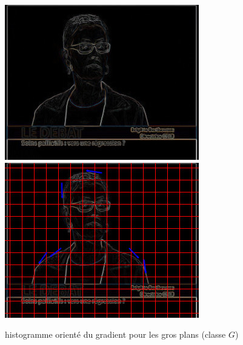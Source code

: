 \documentclass{book}
\begin{document}
\begin{figure}[H]
\begin{center}
\includegraphics[scale=0.3]{hog_exemple2_contour.jpg}
\includegraphics[scale=0.3]{hog_exemple2_gradient.jpg}
\end{center}
\caption{histogramme orienté du gradient pour les gros plans (classe $G$)}
\label{hog_classeG}
\end{figure}

\backmatter

\listoftables

\listoffigures



\end{document}
